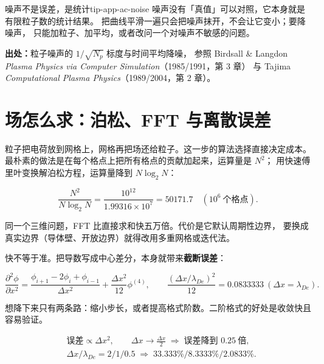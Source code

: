 \begin{tip}{噪声不是误差，是统计}{tip-app-ac-noise}
噪声没有「真值」可以对照，它本身就是有限粒子数的统计结果。
把曲线平滑一遍只会把噪声抹开，不会让它变小；要降噪声，
只能加粒子、加平均，或者改问一个对噪声不敏感的问题。
\end{tip}

{\footnotesize
\textbf{出处：}粒子噪声的 $1/\sqrt{N_p}$ 标度与时间平均降噪，
参照 Birdsall \& Langdon \emph{Plasma Physics via Computer Simulation}（1985/1991，第 3 章）
与 Tajima \emph{Computational Plasma Physics}（1989/2004，第 2 章）。
}

\section{场怎么求：泊松、FFT 与离散误差}
\label{sec:app-ac-field}

粒子把电荷放到网格上，网格再把场还给粒子。这一步的算法选择直接决定成本。
最朴素的做法是在每个格点上把所有格点的贡献加起来，运算量是 $N^2$；
用快速傅里叶变换解泊松方程，运算量降到 $N\log_2 N$：

\begin{equation}
\frac{N^2}{N\log_2 N}
=\frac{10^{12}}{1.99316\times10^{7}}=50171.7\quad(10^{6}\ \text{个格点}).
\label{eq:app-ac-fft}
\end{equation}

同一个三维问题，FFT 比直接求和快五万倍。代价是它默认周期性边界，
要换成真实边界（导体壁、开放边界）就得改用多重网格或迭代法。

快不等于准。把导数写成中心差分，本身就带来\textbf{截断误差}：

\begin{equation}
\frac{\partial^2\phi}{\partial x^2}
=\frac{\phi_{i+1}-2\phi_i+\phi_{i-1}}{\Delta x^2}+\frac{\Delta x^2}{12}\phi^{(4)},
\qquad
\frac{(\Delta x/\lambda_{De})^2}{12}=0.0833333\ (\Delta x=\lambda_{De}).
\label{eq:app-ac-trunc}
\end{equation}

想降下来只有两条路：缩小步长，或者提高格式阶数。二阶格式的好处是收敛快且容易验证。

\begin{equation}
\begin{aligned}
&\text{误差}\propto\Delta x^2,
\qquad
\Delta x\to\frac{\Delta x}{2}\;\Rightarrow\;\text{误差降到 }0.25\ \text{倍},\\
&\Delta x/\lambda_{De}=2/1/0.5\;\Rightarrow\;33.333\%/8.3333\%/2.0833\%.
\end{aligned}
\label{eq:app-ac-order}
\end{equation}

